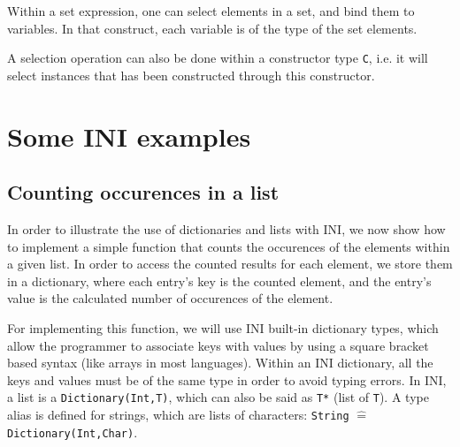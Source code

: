 \documentclass[11pt]{report}
\begin{document}
Within a set expression, one can select elements in a set, and bind them to variables. In that construct, each variable is of the type of the set elements.

\begin{center}
 
\DP
\end{center}

A selection operation can also be done within a constructor type \texttt{C}, i.e. it will select instances that has been constructed through this constructor.

\begin{center}
\DP
\end{center}

\chapter{Some INI examples}

\section{Counting occurences in a list\label{sec:counting_occurences_in_a_list}}

In order to illustrate the use of dictionaries and lists with INI, we now show how to implement a simple function that counts the occurences of the elements within a given list. In order to access the counted results for each element, we store them in a dictionary, where each entry's key is the counted element, and the entry's value is the calculated number of occurences of the element.

For implementing this function, we will use INI built-in dictionary types, which allow the programmer to associate keys with values by using a square bracket based syntax (like arrays in most languages). Within an INI dictionary, all the keys and values must be of the same type in order to avoid typing errors. In INI, a list is a \texttt{Dictionary(Int,T)}, which can also be said as \texttt{T*} (list of \texttt{T}). A type alias is defined for strings, which are lists of characters: \texttt{String} $\widehat=$ \texttt{Dictionary(Int,Char)}.
\end{document}
